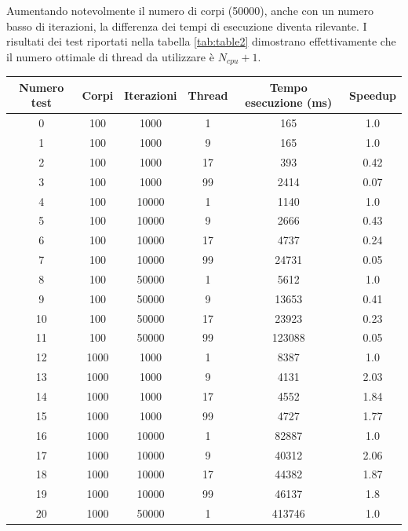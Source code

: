 \documentclass[12pt,a4paper,openright,twoside]{book}
\begin{document}
Aumentando notevolmente il numero di corpi (50000), anche con un numero basso di iterazioni,
la differenza dei tempi di esecuzione diventa rilevante.
I risultati dei test riportati nella tabella \ref{tab:table2} dimostrano effettivamente che
il numero ottimale di thread da utilizzare è $N_{cpu} + 1$.

\begin{center}
	\begin{table}
		\begin{tabular}{ |c|c|c|c|c|c| } 
			\hline
			Numero test & Corpi & Iterazioni & Thread & Tempo esecuzione (ms) & Speedup \\
			\hline
			0 & 100 & 1000 & 1 & 165 & 1.0 \\ 
			\hline
		   1 & 100 & 1000 & 9 & 165 & 1.0 \\ 
			\hline
		   2 & 100 & 1000 & 17 & 393 & 0.42 \\ 
			\hline
		   3 & 100 & 1000 & 99 & 2414 & 0.07 \\ 
			\hline
		   4 & 100 & 10000 & 1 & 1140 & 1.0 \\ 
			\hline
		   5 & 100 & 10000 & 9 & 2666 & 0.43 \\ 
			\hline
		   6 & 100 & 10000 & 17 & 4737 & 0.24 \\ 
			\hline
		   7 & 100 & 10000 & 99 & 24731 & 0.05 \\ 
			\hline
		   8 & 100 & 50000 & 1 & 5612 & 1.0 \\ 
			\hline
		   9 & 100 & 50000 & 9 & 13653 & 0.41 \\ 
			\hline
		   10 & 100 & 50000 & 17 & 23923 & 0.23 \\ 
			\hline
		   11 & 100 & 50000 & 99 & 123088 & 0.05 \\ 
			\hline
		   12 & 1000 & 1000 & 1 & 8387 & 1.0 \\ 
			\hline
		   13 & 1000 & 1000 & 9 & 4131 & 2.03 \\ 
			\hline
		   14 & 1000 & 1000 & 17 & 4552 & 1.84 \\ 
			\hline
		   15 & 1000 & 1000 & 99 & 4727 & 1.77 \\ 
			\hline
		   16 & 1000 & 10000 & 1 & 82887 & 1.0 \\ 
			\hline
		   17 & 1000 & 10000 & 9 & 40312 & 2.06 \\ 
			\hline
		   18 & 1000 & 10000 & 17 & 44382 & 1.87 \\ 
			\hline
		   19 & 1000 & 10000 & 99 & 46137 & 1.8 \\ 
			\hline
		   20 & 1000 & 50000 & 1 & 413746 & 1.0 \\ 

\end{tabular}
\end{table}
\end{center}
\end{document}
